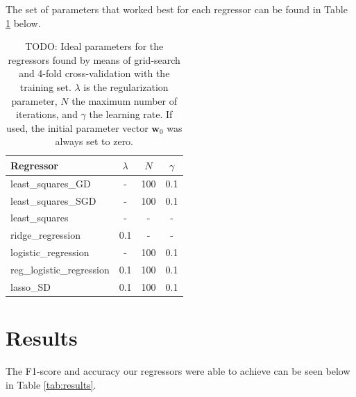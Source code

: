 \documentclass[11pt, a4paper, twocolumn]{article}
\begin{document}
The set of parameters that worked best for each regressor can be found in Table \ref{tab:params} below.

\begin{table}[ht]
    \caption{{\color{red}TODO}: Ideal parameters for the regressors found by means of grid-search
             and 4-fold cross-validation with the training set. $\lambda$ is 
             the regularization parameter, $N$ the maximum number of iterations,
             and $\gamma$ the learning rate. If used, the initial parameter vector
             $\boldsymbol{w}_0$ was always set to zero.}
    \label{tab:params}
    \centering
    \renewcommand{\arraystretch}{1.2}
    \begin{tabular}{@{}lccc@{}}
        \toprule
        Regressor & $\lambda$ & $N$ & $\gamma$ \\
        \midrule
        least\_squares\_GD & - & 100 & 0.1 \\
        least\_squares\_SGD & - & 100 & 0.1 \\
        least\_squares & - & - & -  \\
        ridge\_regression & 0.1 & - & - \\
        logistic\_regression & - & 100 & 0.1 \\
        reg\_logistic\_regression & 0.1 & 100 & 0.1 \\
        lasso\_SD & 0.1 & 100 & 0.1 \\
        \bottomrule
    \end{tabular}
\end{table}

\section{Results}
\label{sec:results}
The F1-score and accuracy our regressors were able to achieve can be seen below in Table
\ref{tab:results}.
\end{document}
